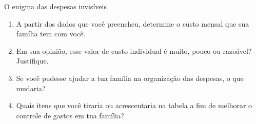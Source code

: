 \begin{task}{O enigma das despesas invisíveis}
\begin{enumerate}

\item A partir dos dados que você preencheu, determine o custo mensal que sua família tem com você.
\item Em sua opinião, esse valor de custo individual é muito, pouco ou razoável? Justifique.
\item Se você pudesse ajudar a tua família na organização das despesas, o que mudaria?
\item Quais itens que você tiraria ou acrescentaria na tabela a fim de melhorar o controle de gastos em tua família?

\end{enumerate}

\end{task}

